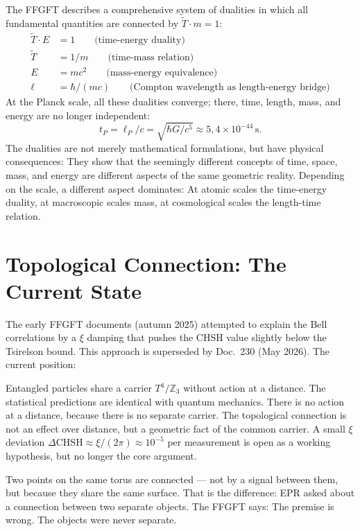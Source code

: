 The FFGFT describes a comprehensive system of dualities in which all
fundamental quantities are connected by $\tilde T\cdot m = 1$:
\begin{align}
  \tilde T\cdot E &= 1\qquad\text{(time-energy duality)} \\
  \tilde T &= 1/m\qquad\text{(time-mass relation)} \\
  E &= mc^2\qquad\text{(mass-energy equivalence)} \\
  \ell &= \hbar/(mc)\qquad\text{(Compton wavelength as length-energy bridge)}
\end{align}
At the Planck scale, all these dualities converge; there, time,
length, mass, and energy are no longer independent:
\begin{equation}
  t_P = \ell_P/c = \sqrt{\hbar G/c^5}\approx5{,}4\times10^{-44}\,\text{s}.
\end{equation}
The dualities are not merely mathematical formulations, but
have physical consequences: They show that the seemingly
different concepts of time, space, mass, and energy are different
aspects of the same geometric reality. Depending on the scale, a different aspect dominates: At atomic scales the time-energy duality, at
macroscopic scales mass, at cosmological scales the length-time relation.

\section{Topological Connection: The Current State}

The early FFGFT documents (autumn 2025) attempted to explain the Bell correlations
by a $\xi$ damping that pushes the CHSH value slightly below
the Tsirelson bound. This approach is superseded by Doc.~230 (May 2026). The current position:

Entangled particles share a carrier $T^4/\mathbb{Z}_3$ without
action at a distance. The statistical predictions are identical with
quantum mechanics. There is no action at a distance, because there is no
separate carrier. The topological connection is not an
effect over distance, but a geometric fact of the common
carrier. A small $\xi$ deviation $\Delta\mathrm{CHSH}\approx
\xi/(2\pi)\approx10^{-5}$ per measurement is open as a working hypothesis,
but no longer the core argument.

\begin{laierspur}
Two points on the same torus are connected --- not by a
signal between them, but because they share the same surface. That
is the difference: EPR asked about a connection between two
separate objects. The FFGFT says: The premise is wrong. The
objects were never separate.
\end{laierspur}

